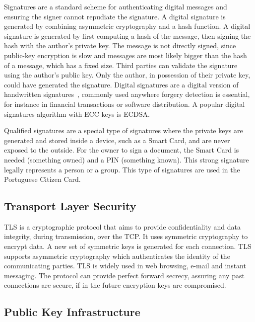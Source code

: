 Signatures are a standard scheme for authenticating digital messages and ensuring the signer cannot repudiate the signature. A digital signature is generated by combining asymmetric cryptography and a hash function.
A digital signature is generated by first computing a hash of the message, then signing the hash with the author's private key. The message is not directly signed, since public-key encryption is slow and messages are most likely bigger than the hash of a message, which has a fixed size. Third parties can validate the signature using the author's public key. Only the author, in possession of their private key, could have generated the signature.
Digital signatures are a digital version of handwritten signatures~\cite{digitalsignatures}, commonly used anywhere forgery detection is essential, for instance in financial transactions or software distribution.
A popular digital signatures algorithm with ECC keys is \ac{ECDSA}.

Qualified signatures are a special type of signatures where the private keys are generated and stored inside a device, such as a Smart Card, and are never exposed to the outside. For the owner to sign a document, the Smart Card is needed (something owned) and a \ac{PIN} (something known). This strong signature legally represents a person or a group. This type of signatures are used in the Portuguese Citizen Card.

\subsection{Transport Layer Security}\label{chap:background:TLS}

\ac{TLS} is a cryptographic protocol that aims to provide confidentiality and data integrity, during transmission, over the \ac{TCP}. It uses symmetric cryptography to encrypt data. A new set of symmetric keys is generated for each connection.
TLS supports asymmetric cryptography which authenticates the identity of the communicating parties.
TLS is widely used in web browsing, e-mail and instant messaging.
The protocol can provide perfect forward secrecy, assuring any past connections are secure, if in the future encryption keys are compromised.

\subsection{Public Key Infrastructure}\label{chap:background:PKI}

